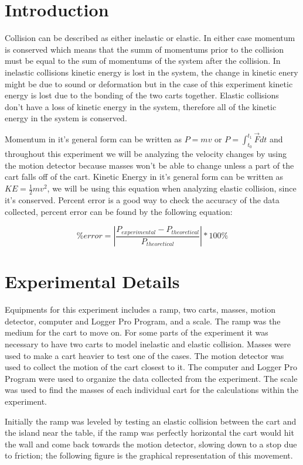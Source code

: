 \documentclass[aps,letterpaper,11pt]{revtex4}
\begin{document}
\section{Introduction}

Collision can be described as either inelastic or elastic. In either case momentum is conserved which means that the summ of momentums prior to the collision must be equal to the sum of momentums of the system after the collision. In inelastic collisions kinetic energy is lost in the system, the change in kinetic enery might be due to sound or deformation but in the case of this experiment kinetic energy is lost due to the bonding of the two carts together. Elastic collisions don't have a loss of kinetic energy in the system, therefore all of the kinetic energy in the system is conserved. 

Momentum in it's general form can be written as $P=mv$ or $ P=\int_{t_0}^{t_1}\vec{F}dt$ and throughout this experiment we will be analyzing the velocity changes by using the motion detector because masses won't be able to change unless a part of the cart falls off of the cart. Kinetic Energy in it's general form can be written as $ KE=\frac{1}{2}mv^2$, we will be using this equation when analyzing elastic collision, since it's conserved. Percent error is a good way to check the accuracy of the data collected, percent error can be found by the following equation:

$$ \% error = |\frac{P_{experimental} - P_{theoretical}}{P_{theoretical}}|*100\%$$

\section{Experimental Details}

Equipments for this experiment includes a ramp, two carts, masses, motion detector, computer and Logger Pro Program, and a scale. The ramp was the medium for the cart to move on. For some parts of the experiment it was necessary to have two carts to model inelastic and elastic collision. Masses were used to make a cart heavier to test one of the cases. The motion detector was used to collect the motion of the cart closest to it. The computer and Logger Pro Program were used to organize the data collected from the experiment. The scale was used to find the masses of each individual cart for the calculations within the experiment. 

Initially the ramp was leveled by testing an elastic collision between the cart and the island near the table, if the ramp was perfectly horizontal the cart would hit the wall and come back towards the motion detector, slowing down to a stop due to friction; the following figure is the graphical representation of this movement. 
\end{document}
